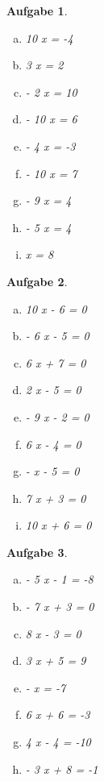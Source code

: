\documentclass[12pt]{article}
\theoremstyle{note}
\newtheorem{aufgabe}{Aufgabe}
\begin{document}
 
    \begin{flushleft}
\begin{aufgabe} ~ \\ 
\begin{multicols}{3} 
\begin{enumerate}[a)] 
\item 
10 x = -4
\item 
3 x = 2
\item 
- 2 x = 10
\item 
- 10 x = 6
\item 
- 4 x = -3
\item 
- 10 x = 7
\item 
- 9 x = 4
\item 
- 5 x = 4
\item 
x = 8
\end{enumerate} 
\end{multicols} 
\end{aufgabe} 
\begin{aufgabe} ~ \\ 
\begin{multicols}{3} 
\begin{enumerate}[a)] 
\item 
10 x - 6 = 0
\item 
- 6 x - 5 = 0
\item 
6 x + 7 = 0
\item 
2 x - 5 = 0
\item 
- 9 x - 2 = 0
\item 
6 x - 4 = 0
\item 
- x - 5 = 0
\item 
7 x + 3 = 0
\item 
10 x + 6 = 0
\end{enumerate} 
\end{multicols} 
\end{aufgabe} 
\begin{aufgabe} ~ \\ 
\begin{multicols}{3} 
\begin{enumerate}[a)] 
\item 
- 5 x - 1 = -8
\item 
- 7 x + 3 = 0
\item 
8 x - 3 = 0
\item 
3 x + 5 = 9
\item 
- x = -7
\item 
6 x + 6 = -3
\item 
4 x - 4 = -10
\item 
- 3 x + 8 = -1

\end{enumerate}
\end{multicols}
\end{aufgabe}
\end{flushleft}
\end{document}
